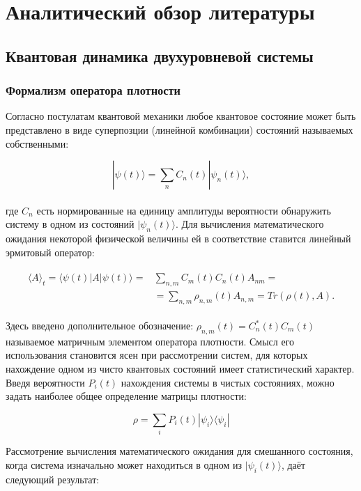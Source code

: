 \section{Аналитический обзор литературы}
\subsection{Квантовая динамика двухуровневой системы}
\subsubsection{Формализм оператора плотности}

Согласно постулатам квантовой механики любое квантовое состояние может быть представлено в виде суперпозции (линейной комбинации) состояний называемых собственными:

\begin{equation}
\label{superposition}
|\psi(t)\rangle = \sum_n C_n(t)|\psi_n(t)\rangle,
\end{equation}
\\
\noindent где $C_n$ есть нормированные на единицу амплитуды вероятности обнаружить систему в одном из состояний $|\psi_n(t)\rangle$. Для вычисления математического ожидания некоторой физической величины ей в соответствие ставится линейный эрмитовый оператор:

\begin{eqnarray}
\begin{split}
\label{operator}
\langle A \rangle _t = \langle \psi(t) | A |\psi(t)\rangle = &
  \sum_{n,m} C_m(t) C_n(t) A_{nm} = \\
&= \sum_{n,m} \rho_{n,m}(t) A_{n,m} = Tr (\rho(t), A).
\end{split}
\end{eqnarray} 

Здесь введено дополнительное обозначение: $\rho_{n,m}(t)= C^*_n(t)C_m(t)$  называемое матричным элементом оператора плотности. Смысл его использования становится ясен при рассмотрении систем, для которых нахождение одном из чисто квантовых состояний имеет статистический характер. Введя вероятности $P_i(t)$ нахождения системы в чистых состояниях, можно задать наиболее общее определение матрицы плотности:

\begin{equation}
	\rho = \sum_i P_i(t) |\psi_i\rangle\langle\psi_i|
\end{equation} 

Рассмотрение вычисления математического ожидания для смешанного состояния, когда система изначально может находиться в одном из $|\psi_i(t)\rangle$, даёт следующий результат:

